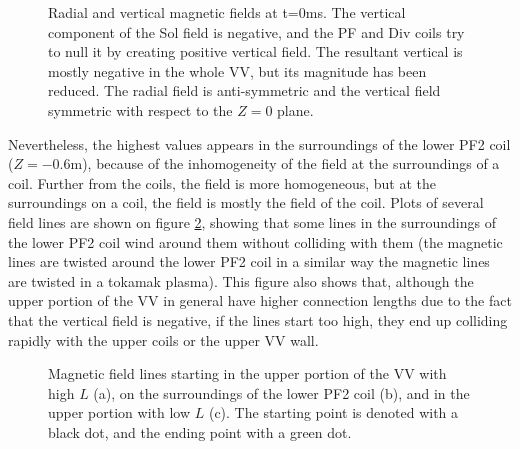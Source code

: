 \documentclass[a4paper,12pt,oneside]{book}
\begin{document}
\begin{figure}[htbp]
\centering
{}
\hfill
{}

\caption{Radial and vertical magnetic fields at t=0ms. The vertical component of the Sol field is negative, and the PF and Div coils try to null it by creating positive vertical field. The resultant vertical is mostly negative in the whole VV, but its magnitude has been reduced. The radial field is anti-symmetric and the vertical field symmetric with respect to the $Z=0$ plane.}
\label{fig_BR_BZ_int}
\end{figure}

Nevertheless, the highest values appears in the surroundings of the lower PF2 coil ($Z=-0.6$m), because of the inhomogeneity of the field at the surroundings of a coil. Further from the coils, the field is more homogeneous, but at the surroundings on a coil, the field is mostly the field of the coil. Plots of several field lines are shown on figure \ref{fig_lines_int}, showing that some lines in the surroundings of the lower PF2 coil wind around them without colliding with them (the magnetic lines are twisted around the lower PF2 coil in a similar way the magnetic lines are twisted in a tokamak plasma). This figure also shows that, although the upper portion of the VV in general have higher connection lengths due to the fact that the vertical field is negative, if the lines start too high, they end up colliding rapidly with the upper coils or the upper VV wall.

\begin{figure}[t]
\centering
{}
\hfill
{}


\caption{Magnetic field lines starting in the upper portion of the VV with high $L$ (a), on the surroundings of the lower PF2 coil (b), and in the upper portion with low $L$ (c). The starting point is denoted with a black dot, and the ending point with a green dot.}
\label{fig_lines_int}
\end{figure}
\end{document}
